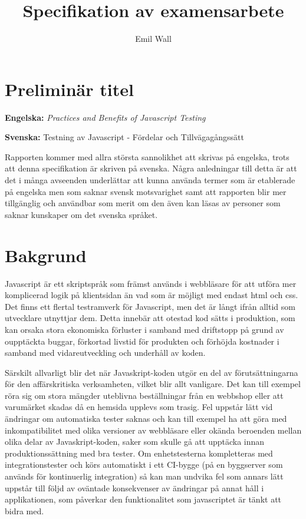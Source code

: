 \documentclass[11pt]{article}
\title{Specifikation av examensarbete}
\author{Emil Wall}
\begin{document}
\maketitle

\section{Preliminär titel}

\textbf{Engelska:} \textit{\foreignlanguage{english}{Practices and Benefits of Javascript Testing}}

\textbf{Svenska:} Testning av Javascript - Fördelar och Tillvägagångssätt

Rapporten kommer med allra största sannolikhet att skrivas på engelska, trots att denna specifikation är skriven på svenska. Några anledningar till detta är att det i många avseenden underlättar att kunna använda termer som är etablerade på engelska men som saknar svensk motsvarighet samt att rapporten blir mer tillgänglig och användbar som merit om den även kan läsas av personer som saknar kunskaper om det svenska språket.

\section{Bakgrund}

Javascript är ett skriptspråk som främst används i webbläsare för att utföra mer komplicerad logik på klientsidan än vad som är möjligt med endast html och css. Det finns ett flertal testramverk för Javascript, men det är långt ifrån alltid som utvecklare utnyttjar dem. Detta innebär att otestad kod sätts i produktion, som kan orsaka stora ekonomiska förluster i samband med driftstopp på grund av oupptäckta buggar, förkortad livstid för produkten och förhöjda kostnader i samband med vidareutveckling och underhåll av koden.

Särskilt allvarligt blir det när Javaskript-koden utgör en del av förutsättningarna för den affärskritiska verksamheten, vilket blir allt vanligare. Det kan till exempel röra sig om stora mängder uteblivna beställningar från en webbshop eller att varumärket skadas då en hemsida upplevs som trasig. Fel uppstår lätt vid ändringar om automatiska tester saknas och kan till exempel ha att göra med inkompatibilitet med olika versioner av webbläsare eller okända beroenden mellan olika delar av Javaskript-koden, saker som skulle gå att upptäcka innan produktionssättning med bra tester. Om enhetstesterna kompletteras med integrationstester och körs automatiskt i ett CI-bygge (på en byggserver som används för kontinuerlig integration) så kan man undvika fel som annars lätt uppstår till följd av oväntade konsekvenser av ändringar på annat håll i applikationen, som påverkar den funktionalitet som javascriptet är tänkt att bidra med.
\end{document}
